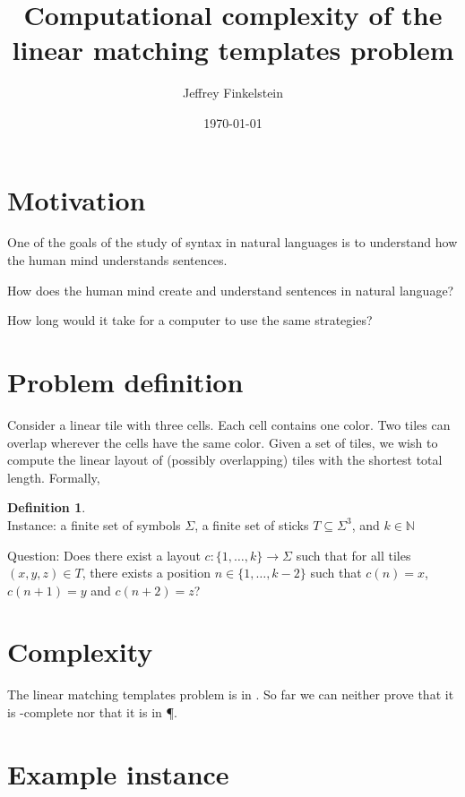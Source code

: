 \documentclass{lposter}
\title{Computational complexity of the linear matching templates problem}
\author{Jeffrey Finkelstein}
\date{\today}
\theoremstyle{definition} \newtheorem*{definition}{Definition}
\begin{document}
\begin{poster}

\section{Motivation}

One of the goals of the study of syntax in natural languages is to understand
how the human mind understands sentences. 

How does the human mind create and understand sentences in natural language?

How long would it take for a computer to use the same strategies?

\section{Problem definition}

Consider a linear tile with three cells. Each cell contains one color. Two
tiles can overlap wherever the cells have the same color. Given a set of tiles,
we wish to compute the linear layout of (possibly overlapping) tiles with the
shortest total length. Formally,

\begin{shaded}
\begin{definition}\mbox{}\\
  Instance: a finite set of symbols $\Sigma$, a finite set of sticks
  $T\subseteq\Sigma^3$, and $k\in\mathbb{N}$

  Question: Does there exist a layout $c\colon\{1,\ldots,k\}\to\Sigma$ such
  that for all tiles $(x, y, z)\in T$, there exists a position
  $n\in\{1,\ldots,k-2\}$ such that $c(n)=x$, $c(n+1)=y$ and $c(n+2)=z$?
\end{definition}
\end{shaded}

\section{Complexity}

The linear matching templates problem is in \NP. So far we can neither prove
that it is \NP-complete nor that it is in \P.

\columnbreak

\section{Example instance}


\end{poster}
\end{document}
